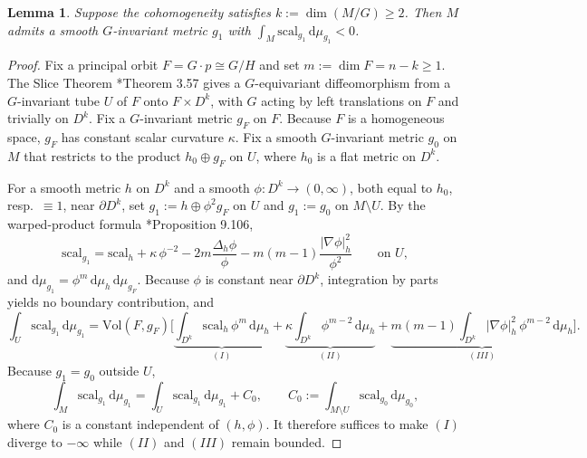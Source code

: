 \documentclass[12pt,a4paper]{amsart}
\theoremstyle{plain}
\newtheorem{lemma}[theorem]{Lemma}
\theoremstyle{definition}
\theoremstyle{remark}
\newcommand{\ga}{\mathit{g}} %
\begin{document}
\begin{lemma}\label{lem:negativetotalscal}
Suppose the cohomogeneity satisfies $k:= \dim(M/G)\ge 2$. Then $M$ admits a smooth
$G$-invariant metric $\ga_1$ with $\displaystyle\int_M \mathrm{scal}_{\ga_1}\,\mathrm{d}\mu_{\ga_1} < 0$.
\end{lemma}
\begin{proof}
Fix a principal orbit $F = G\cdot p \cong G/H$ and set $m:=\dim F=n-k\ge 1$.
The Slice Theorem \cite{alexandrino2015lie}*{Theorem 3.57} gives a $G$-equivariant
diffeomorphism from a $G$-invariant tube $U$ of $F$ onto $F\times D^k$, with $G$
acting by left translations on $F$ and trivially on $D^k$. Fix a $G$-invariant metric $g_F$ on $F$. Because $F$ is a homogeneous space, $\ga_F$ has constant scalar curvature $\kappa$. Fix a smooth $G$-invariant metric $\ga_0$ on
$M$ that restricts to the product $h_0\oplus g_F$ on $U$, where $h_0$ is a flat metric on
$D^k$.

For a smooth metric $h$ on $D^k$ and a smooth $\phi\colon D^k\to(0,\infty)$, both equal to
$h_0$, resp.\ $\equiv 1$, near $\partial D^k$, set $\ga_1:=h\oplus\phi^2 g_F$ on $U$ and
$\ga_1:=\ga_0$ on $M\setminus U$. By the
warped-product formula \cite{besse1987einstein}*{Proposition 9.106},
\[
\mathrm{scal}_{\ga_1}=\mathrm{scal}_h+\kappa\,\phi^{-2}-2m\frac{\Delta_h\phi}{\phi}
-m(m-1)\frac{|\nabla\phi|_h^2}{\phi^2}\qquad\text{on }U,
\]
and $\mathrm{d}\mu_{\ga_1}=\phi^m\,\mathrm{d}\mu_h\,\mathrm{d}\mu_{g_F}$. Because $\phi$ is constant near
$\partial D^k$, integration by parts yields no boundary
contribution, and
\begin{equation}\label{eq:totalscalformula}
\int_U \mathrm{scal}_{\ga_1}\,\mathrm{d}\mu_{\ga_1}
=\mathrm{Vol}(F,g_F)\Big[\underbrace{\int_{D^k}\!\mathrm{scal}_h\,\phi^m\,\mathrm{d}\mu_h}_{(I)}
+\underbrace{\kappa\!\int_{D^k}\!\phi^{m-2}\,\mathrm{d}\mu_h}_{(II)}
+\underbrace{m(m-1)\!\int_{D^k}\!|\nabla\phi|_h^2\,\phi^{m-2}\,\mathrm{d}\mu_h}_{(III)}\Big].
\end{equation}
Because $\ga_1=\ga_0$ outside $U$,
\begin{equation}\label{eq:globalsplit}
\int_M \mathrm{scal}_{\ga_1}\,\mathrm{d}\mu_{\ga_1}
=\int_U \mathrm{scal}_{\ga_1}\,\mathrm{d}\mu_{\ga_1}+C_0,\qquad
C_0:=\int_{M\setminus U}\mathrm{scal}_{\ga_0}\,\mathrm{d}\mu_{\ga_0},
\end{equation}
where $C_0$ is a constant independent of $(h,\phi)$. It therefore suffices to make $(I)$
diverge to $-\infty$ while $(II)$ and $(III)$ remain bounded.


\end{proof}
\end{document}
